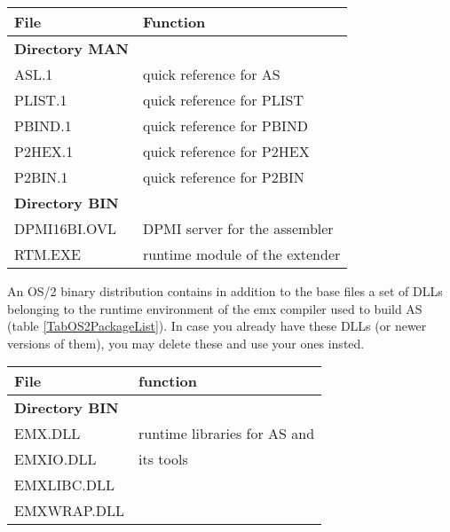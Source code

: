 \documentclass[12pt,twoside]{report}
\begin{document}
\begin{table*}[htp]
\begin{center}\begin{tabular}{|l|l|}
\hline
File              & Function \\
\hline
\hline
{\bf Directory MAN} & \\
\hline
ASL.1             & quick reference for AS \\
PLIST.1           & quick reference for PLIST \\
PBIND.1           & quick reference for PBIND \\
P2HEX.1           & quick reference for P2HEX \\
P2BIN.1           & quick reference for P2BIN \\
\hline
\hline
{\bf Directory BIN} & \\
\hline
DPMI16BI.OVL   & DPMI server for the assembler \\
RTM.EXE        & runtime module of the extender \\
\hline
\end{tabular}\end{center}
\caption{Additional Files in a DPMI Binary Distribution
         \label{TabDPMIPackageList}}
\end{table*}

An OS/2 binary distribution  contains in addition to
the base files a set of DLLs belonging to the runtime environment of the
emx compiler used to build AS (table \ref{TabOS2PackageList}).  In case
you already have these DLLs (or newer versions of them), you may delete
these and use your ones insted.

\begin{table*}[htp]
\begin{center}\begin{tabular}{|l|l|}
\hline
File              & function \\
\hline
\hline
{\bf Directory BIN} & \\
\hline
EMX.DLL           & runtime libraries for AS and \\
EMXIO.DLL         & its tools \\
EMXLIBC.DLL       & \\
EMXWRAP.DLL       & \\
\hline
\end{tabular}\end{center}
\caption{Additional Files in an OS/2 binary distribution
         \label{TabOS2PackageList}}
\end{table*}
\end{document}
